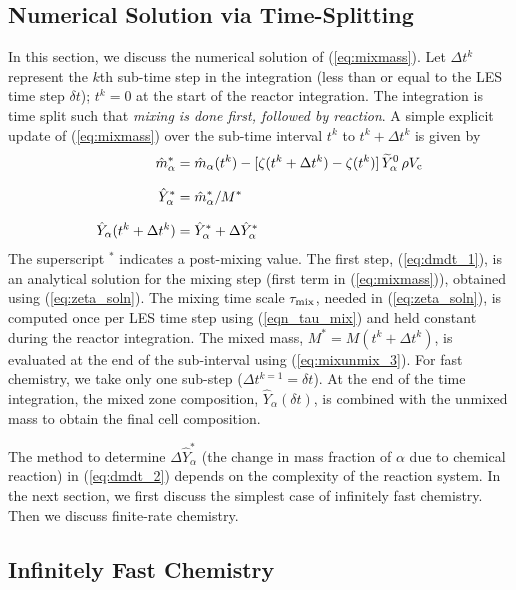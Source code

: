 \subsection{Numerical Solution via Time-Splitting}
\label{sec:reac_time_integration}

In this section, we discuss the numerical solution of (\ref{eq:mixmass}). Let $\Delta t^k$ represent the $k$th sub-time step in the integration (less than or equal to the LES time step $\delta t$); $t^k=0$ at the start of the reactor integration.  The integration is time split such that \emph{mixing is done first, followed by reaction}. A simple explicit update of (\ref{eq:mixmass}) over the sub-time interval $t^k$ to $t^k + \Delta t^k$ is given by
\begin{align}
\label{eq:dmdt_1} \hat{m}_\alpha^* &= \hat{m}_{\alpha}(t^k) - [ \zeta(t^k+\Delta t^k) - \zeta(t^k) ] \, \widetilde{Y}_{\alpha}^0 \, \rho V_{\rm c} \\[0.1in]
\label{eq:ystar}  \hat{Y}_\alpha^* &= \hat{m}_\alpha^*/M^* \\[0.1in]
\label{eq:dmdt_2} \hat{Y}_\alpha(t^k + \Delta t^k) &= \hat{Y}_\alpha^* + \Delta \hat{Y}_\alpha^*
\end{align}
The superscript $^*$ indicates a post-mixing value.  The first step, (\ref{eq:dmdt_1}), is an analytical solution for the mixing step (first term in (\ref{eq:mixmass})), obtained using (\ref{eq:zeta_soln}).  The mixing time scale $\tau_{\rm mix}$, needed in (\ref{eq:zeta_soln}), is computed once per LES time step using (\ref{eqn_tau_mix}) and held constant during the reactor integration. The mixed mass, $M^* = M(t^k + \Delta t^k)$, is evaluated at the end of the sub-interval using (\ref{eq:mixunmix_3}). For fast chemistry, we take only one sub-step ($\Delta t^{k=1} = \delta t$). At the end of the time integration, the mixed zone composition, $\hat{Y}_\alpha(\delta t)$, is combined with the unmixed mass to obtain the final cell composition.

The method to determine $\Delta \hat{Y}_\alpha^*$ (the change in mass fraction of $\alpha$ due to chemical reaction) in (\ref{eq:dmdt_2}) depends on the complexity of the reaction system. In the next section, we first discuss the simplest case of infinitely fast chemistry.  Then we discuss finite-rate chemistry.



\subsection{Infinitely Fast Chemistry}
\label{sec:fastchemistry}

